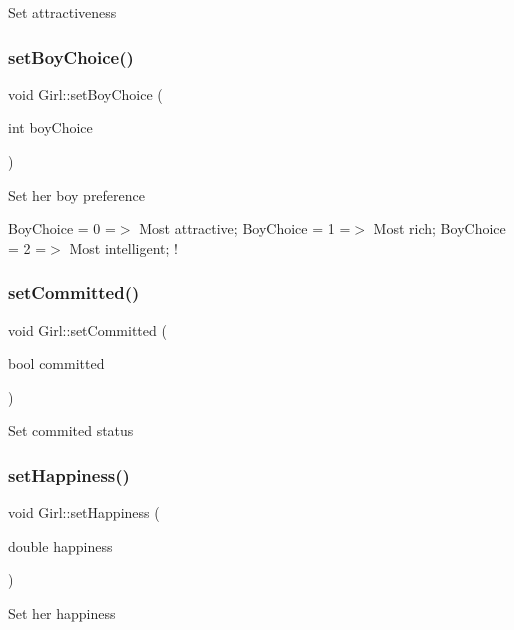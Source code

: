 Set attractiveness \mbox{\label{class_girl_a48efb2fda11ce41c74511be3bfc2510c}} 
\subsubsection{\texorpdfstring{set\+Boy\+Choice()}{setBoyChoice()}}
{\footnotesize\ttfamily void Girl\+::set\+Boy\+Choice (\begin{DoxyParamCaption}\item[{int}]{boy\+Choice }\end{DoxyParamCaption})}

Set her boy preference

Boy\+Choice = 0 =$>$ Most attractive; Boy\+Choice = 1 =$>$ Most rich; Boy\+Choice = 2 =$>$ Most intelligent; ! \mbox{\label{class_girl_a7f02a69fc79e52b46161ed49f8901ecd}} 
\subsubsection{\texorpdfstring{set\+Committed()}{setCommitted()}}
{\footnotesize\ttfamily void Girl\+::set\+Committed (\begin{DoxyParamCaption}\item[{bool}]{committed }\end{DoxyParamCaption})}

Set commited status \mbox{\label{class_girl_a786c96c2084a8571ee04b1b38b4eb357}} 
\subsubsection{\texorpdfstring{set\+Happiness()}{setHappiness()}}
{\footnotesize\ttfamily void Girl\+::set\+Happiness (\begin{DoxyParamCaption}\item[{double}]{happiness }\end{DoxyParamCaption})}

Set her happiness \mbox{\label{class_girl_aeeb035a49f221a0ba3744b35e26fba3f}} 
